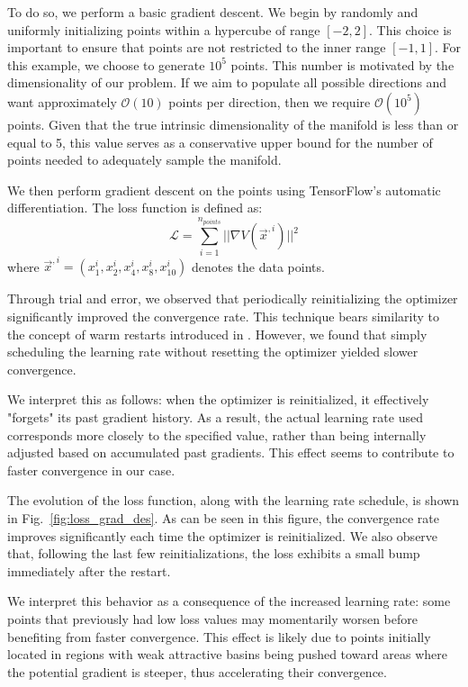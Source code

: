 \documentclass[11pt]{article}
\begin{document}
		To do so, we perform a basic gradient descent. We begin by randomly and uniformly initializing points within a hypercube of range $[-2,2]$. This choice is important to ensure that points are not restricted to the inner range $[-1,1]$. For this example, we choose to generate $10^5$ points. This number is motivated by the dimensionality of our problem. If we aim to populate all possible directions and want approximately $\mathcal{O}(10)$ points per direction, then we require $\mathcal{O}(10^5)$ points. Given that the true intrinsic dimensionality of the manifold is less than or equal to 5, this value serves as a conservative upper bound for the number of points needed to adequately sample the manifold.
		
		We then perform gradient descent on the points using TensorFlow’s automatic differentiation. The loss function is defined as:
		\begin{equation}
			\mathcal{L} = \sum_{i = 1}^{n_{points}} || \nabla V(\vec{x}^{,i})||^2
		\end{equation}
		where $\vec{x}^{,i} = (x^i_1,x^i_2,x^i_4,x^i_8,x^i_{10})$ denotes the data points.

		Through trial and error, we observed that periodically reinitializing the optimizer significantly improved the convergence rate. This technique bears similarity to the concept of warm restarts introduced in \cite{loshchilov2017sgdrstochasticgradientdescent}. However, we found that simply scheduling the learning rate without resetting the optimizer yielded slower convergence.
		
		We interpret this as follows: when the optimizer is reinitialized, it effectively "forgets" its past gradient history. As a result, the actual learning rate used corresponds more closely to the specified value, rather than being internally adjusted based on accumulated past gradients. This effect seems to contribute to faster convergence in our case. 
		
		The evolution of the loss function, along with the learning rate schedule, is shown in Fig.~\ref{fig:loss_grad_des}. As can be seen in this figure, the convergence rate improves significantly each time the optimizer is reinitialized. We also observe that, following the last few reinitializations, the loss exhibits a small bump immediately after the restart.
		
		We interpret this behavior as a consequence of the increased learning rate: some points that previously had low loss values may momentarily worsen before benefiting from faster convergence. This effect is likely due to points initially located in regions with weak attractive basins being pushed toward areas where the potential gradient is steeper, thus accelerating their convergence.
		
\end{document}
